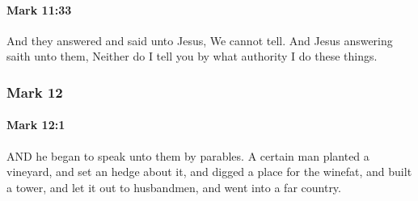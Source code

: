 		\paragraph{Mark 11:33} %
			\label{MARK-11-33}

			And they answered and said unto Jesus, We cannot tell. And Jesus answering saith unto them, Neither do I tell you by what authority I do these things.

			\begin{framed}
			\scriptsize
				\begin{compactdesc}
					\item[SBLG]  \hyperref[EXOUSIA]{} 
				\end{compactdesc}
			\end{framed}

	\subsubsection{Mark 12} %
		\label{MARK-12}
		
		\paragraph{Mark 12:1} %
			\label{MARK-12-1}

			AND he began to speak unto them by parables. A certain man planted a vineyard, and set an hedge about it, and digged a place for the winefat, and built a tower, and let it out to husbandmen, and went into a far country.

